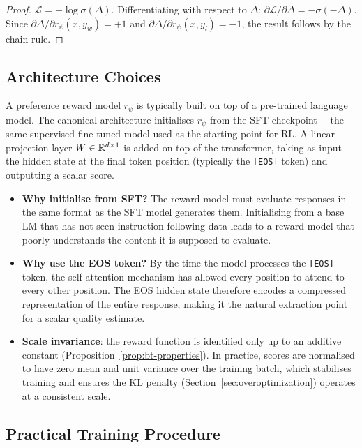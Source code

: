 \begin{proof}
$\mathcal{L} = -\log\sigma(\Delta)$. Differentiating with respect to $\Delta$: $\partial\mathcal{L}/\partial\Delta = -\sigma(-\Delta)$. Since $\partial\Delta/\partial r_\psi(x,y_w) = +1$ and $\partial\Delta/\partial r_\psi(x,y_l) = -1$, the result follows by the chain rule.
\end{proof}

\subsection{Architecture Choices}

A preference reward model $r_\psi$ is typically built on top of a pre-trained language model. The canonical architecture initialises $r_\psi$ from the SFT checkpoint\,---\,the same supervised fine-tuned model used as the starting point for RL. A linear projection layer $W \in \mathbb{R}^{d \times 1}$ is added on top of the transformer, taking as input the hidden state at the final token position (typically the \texttt{[EOS]} token) and outputting a scalar score.

\begin{itemize}[leftmargin=*]
  \item \textbf{Why initialise from SFT?} The reward model must evaluate responses in the same format as the SFT model generates them. Initialising from a base LM that has not seen instruction-following data leads to a reward model that poorly understands the content it is supposed to evaluate.
  \item \textbf{Why use the EOS token?} By the time the model processes the \texttt{[EOS]} token, the self-attention mechanism has allowed every position to attend to every other position. The EOS hidden state therefore encodes a compressed representation of the entire response, making it the natural extraction point for a scalar quality estimate.
  \item \textbf{Scale invariance}: the reward function is identified only up to an additive constant (Proposition~\ref{prop:bt-properties}). In practice, scores are normalised to have zero mean and unit variance over the training batch, which stabilises training and ensures the KL penalty (Section~\ref{sec:overoptimization}) operates at a consistent scale.
\end{itemize}

\subsection{Practical Training Procedure}


